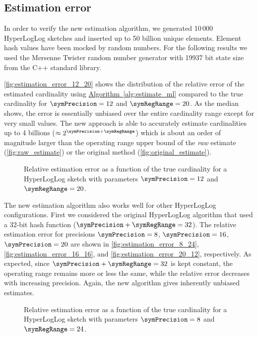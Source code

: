 \documentclass[11pt]{article} %
\newcommand*{\algoref}[1]{\hyperref[#1]{Algorithm~\ref*{#1}}}
\begin{document}
\subsection{Estimation error}
In order to verify the new estimation algorithm, we generated 10\,000 HyperLogLog sketches and inserted up to 50 billion unique elements. Element hash values have been mocked by random numbers. For the following results we used the Mersenne Twister random number generator with 19937 bit state size from the C++ standard library.

\autoref{fig:estimation_error_12_20} shows the distribution of the relative error of the estimated cardinality using \algoref{alg:estimate_ml} compared to the true cardinality for $\symPrecision=12$ and $\symRegRange=20$. As the median shows, the error is essentially unbiased over the entire cardinality range except for very small values. The new approach is able to accurately estimate cardinalities up to 4 billions ($\approx 2^{\symPrecision+\symRegRange}$) which is about an order of magnitude larger than the operating range upper bound of the \emph{raw} estimate (\autoref{fig:raw_estimate}) or the original method (\autoref{fig:original_estimate}).

\begin{figure}
\centering

\caption{Relative estimation error as a function of the true cardinality for a HyperLogLog sketch with parameters $\symPrecision = 12$ and $\symRegRange=20$.}
\label{fig:estimation_error_12_20}
\end{figure}

The new estimation algorithm also works well for other HyperLogLog configurations. First we considered the original HyperLogLog algorithm that used a 32-bit hash function ($\symPrecision + \symRegRange = 32$). The relative estimation error for precisions $\symPrecision=8$, $\symPrecision=16$, $\symPrecision=20$ are shown in \autoref{fig:estimation_error_8_24}, \autoref{fig:estimation_error_16_16}, and \autoref{fig:estimation_error_20_12}, respectively. As expected, since  $\symPrecision + \symRegRange = 32$ is kept constant, the operating range remains more or less the same, while the relative error decreases with increasing precision. Again, the new algorithm gives inherently unbiased estimates.

\begin{figure}
\centering

\caption{Relative estimation error as a function of the true cardinality for a HyperLogLog sketch with parameters $\symPrecision = 8$ and $\symRegRange=24$.}
\label{fig:estimation_error_8_24}
\end{figure}
\end{document}
